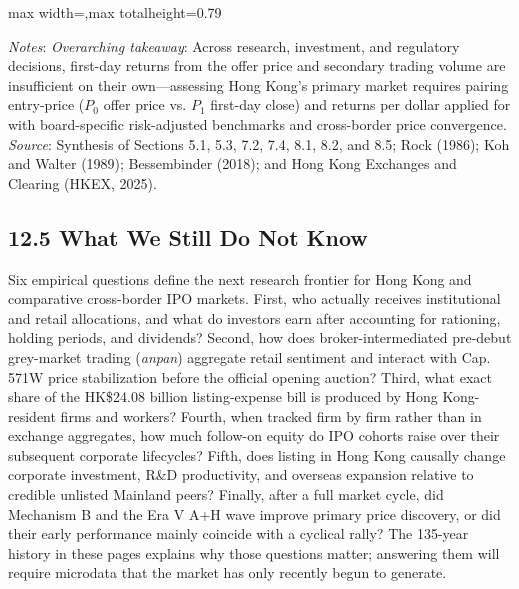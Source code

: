 \documentclass[11pt,letterpaper]{article}
\begin{document}
\begin{table}[!htbp]
\begin{adjustbox}{max width=\textwidth,max totalheight=0.79\textheight}
\begin{minipage}{\textwidth}
\end{minipage}
\end{adjustbox}
\par\vspace{3pt}\noindent\parbox{\textwidth}{\scriptsize\raggedright \textit{Notes}: \textit{Overarching takeaway}: Across research, investment, and regulatory decisions, first-day returns from the offer price and secondary trading volume are insufficient on their own—assessing Hong Kong's primary market requires pairing entry-price ($P_0$ offer price vs. $P_1$ first-day close) and returns per dollar applied for with board-specific risk-adjusted benchmarks and cross-border price convergence. \textit{Source}: Synthesis of Sections 5.1, 5.3, 7.2, 7.4, 8.1, 8.2, and 8.5; Rock (1986); Koh and Walter (1989); Bessembinder (2018); and Hong Kong Exchanges and Clearing (HKEX, 2025).}
\end{table}

\subsection*{\texorpdfstring{12.5 What We Still Do Not Know}{12.5 What We Still Do Not Know}}
Six empirical questions define the next research frontier for Hong Kong and comparative cross-border IPO markets. First, who actually receives institutional and retail allocations, and what do investors earn after accounting for rationing, holding periods, and dividends? Second, how does broker-intermediated pre-debut grey-market trading (\textit{anpan}) aggregate retail sentiment and interact with Cap. 571W price stabilization before the official opening auction? Third, what exact share of the HK\$24.08 billion listing-expense bill is produced by Hong Kong-resident firms and workers? Fourth, when tracked firm by firm rather than in exchange aggregates, how much follow-on equity do IPO cohorts raise over their subsequent corporate lifecycles? Fifth, does listing in Hong Kong causally change corporate investment, R\&D productivity, and overseas expansion relative to credible unlisted Mainland peers? Finally, after a full market cycle, did Mechanism B and the Era V A+H wave improve primary price discovery, or did their early performance mainly coincide with a cyclical rally? The 135-year history in these pages explains why those questions matter; answering them will require microdata that the market has only recently begun to generate.
\end{document}

